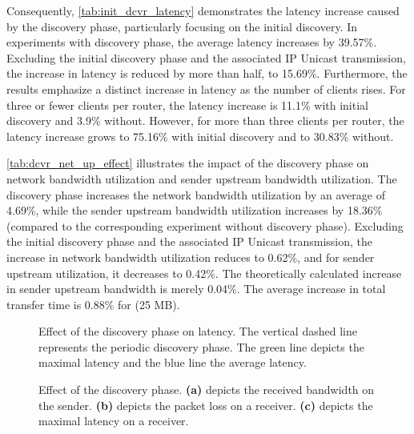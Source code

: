 Consequently, \autoref{tab:init_dcvr_latency} demonstrates the latency increase
    caused by the discovery phase, particularly focusing on the initial
    discovery.
In experiments with discovery phase, the average latency increases by 39.57\%.
Excluding the initial discovery phase and the associated IP Unicast
    transmission, the increase in latency is reduced by more than half, to
    15.69\%.
Furthermore, the results emphasize a distinct increase in latency as the number
    of clients rises.
For three or fewer clients per router, the latency increase is 11.1\% with 
    initial discovery and 3.9\% without.
However, for more than three clients per router, the latency increase grows to
    75.16\% with initial discovery and to 30.83\% without.

\autoref{tab:dcvr_net_up_effect} illustrates the impact of the discovery phase
    on network bandwidth utilization and sender upstream bandwidth utilization.
The discovery phase increases the network bandwidth utilization by an average
    of 4.69\%, while the sender upstream bandwidth utilization increases by
    18.36\% (compared to the corresponding experiment without discovery phase).
Excluding the initial discovery phase and the associated IP Unicast
    transmission, the increase in network bandwidth utilization reduces to
    0.62\%, and for sender upstream utilization, it decreases to 0.42\%.
The theoretically calculated increase in sender upstream bandwidth is merely
    0.04\%.
The average increase in total transfer time is 0.88\% for \ucii{} (25 MB).

\begin{figure}
    \begin{center}
        
    \end{center}
    \caption[Effect of the discovery phase on latency]{
        \nuci{} Effect of the discovery phase on latency.
        The vertical dashed line represents the periodic discovery phase.
        The green line depicts the maximal latency and the blue line the
        average latency.
    }
    \label{fig:dcvr_latency_effect}
\end{figure}

\begin{figure}
    \begin{center}
        
    \end{center}
    \caption[Effect of the discovery phase]{
        Effect of the discovery phase.
        \textbf{(a)} depicts the received bandwidth on the sender.
        \textbf{(b)} depicts the packet loss on a receiver.
        \textbf{(c)} depicts the maximal latency on a receiver.
    }
    \label{fig:dcvr_loss_effect}
\end{figure}


